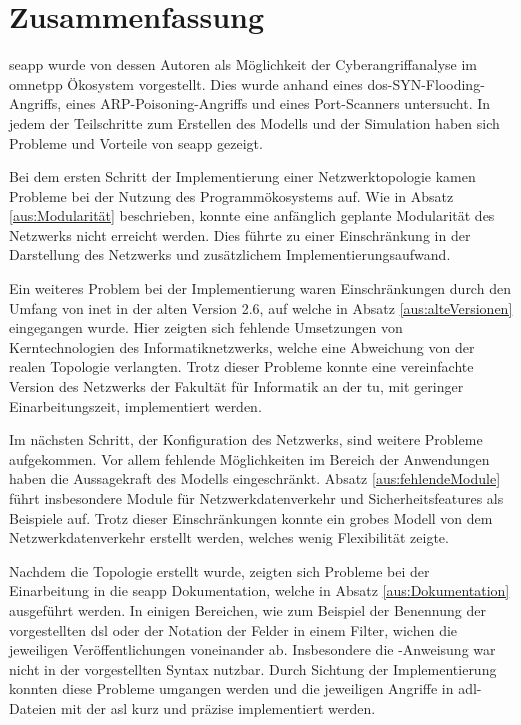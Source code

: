 \chapter{Zusammenfassung}\label{chap:schluss6}
\gls{seapp} wurde von dessen Autoren als Möglichkeit der Cyberangriffanalyse im \gls{omnetpp} Ökosystem vorgestellt. Dies wurde anhand eines \gls{dos}-SYN-Flooding-Angriffs, eines ARP-Poisoning-Angriffs und eines Port-Scanners untersucht. In jedem der Teilschritte zum Erstellen des Modells und der Simulation haben sich Probleme und Vorteile von \gls{seapp} gezeigt.

Bei dem ersten Schritt der Implementierung einer Netzwerktopologie kamen Probleme bei der Nutzung des Programmökosystems auf. Wie in Absatz \ref{aus:Modularität} beschrieben, konnte eine anfänglich geplante Modularität des Netzwerks nicht erreicht werden. Dies führte zu einer Einschränkung in der Darstellung des Netzwerks und zusätzlichem Implementierungsaufwand.

Ein weiteres Problem bei der Implementierung waren Einschränkungen durch den Umfang von \gls{inet} in der alten Version 2.6, auf welche in Absatz \ref{aus:alteVersionen} eingegangen wurde. Hier zeigten sich fehlende Umsetzungen von Kerntechnologien des Informatiknetzwerks, welche eine Abweichung von der realen Topologie verlangten. Trotz dieser Probleme konnte eine vereinfachte Version des Netzwerks der Fakultät für Informatik an der \gls{tu}, mit geringer Einarbeitungszeit, implementiert werden. 

Im nächsten Schritt, der Konfiguration des Netzwerks, sind weitere Probleme aufgekommen. Vor allem fehlende Möglichkeiten im Bereich der Anwendungen haben die Aussagekraft des Modells eingeschränkt. Absatz \ref{aus:fehlendeModule} führt insbesondere Module für Netzwerkdatenverkehr und Sicherheitsfeatures als Beispiele auf. Trotz dieser Einschränkungen konnte ein grobes Modell von dem Netzwerkdatenverkehr erstellt werden, welches wenig Flexibilität zeigte.

Nachdem die Topologie erstellt wurde, zeigten sich Probleme bei der Einarbeitung in die \gls{seapp} Dokumentation, welche in Absatz \ref{aus:Dokumentation} ausgeführt werden. In einigen Bereichen, wie zum Beispiel der Benennung der vorgestellten \gls{dsl} oder der Notation der Felder in einem Filter, wichen die jeweiligen Veröffentlichungen voneinander ab. Insbesondere  die -Anweisung war nicht in der vorgestellten Syntax nutzbar. Durch Sichtung der Implementierung konnten diese Probleme umgangen werden und die jeweiligen Angriffe in \gls{adl}-Dateien mit der \gls{asl} kurz und präzise implementiert werden.

